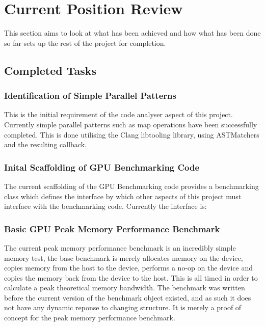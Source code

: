
\section{Current Position Review}

This section aims to look at what has been achieved and how what has been done so far sets up the rest of the project for completion.

\subsection{Completed Tasks}
\subsubsection{Identification of Simple Parallel Patterns}
This is the initial requirement of the code analyser aspect of this project. Currently simple parallel patterns such as map operations have been successfully completed. This is done utilising the Clang libtooling library, using ASTMatchers and the resulting callback.

\subsubsection{Inital Scaffolding of GPU Benchmarking Code}
The current scaffolding of the GPU Benchmarking code provides a benchmarking class which defines the interface by which other aspects of this project must interface with the benchmarking code. Currently the interface is:

\subsubsection{Basic GPU Peak Memory Performance Benchmark}
The current peak memory performance benchmark is an incredibly simple memory test, the base benchmark is merely allocates memory on the device, copies memory from the host to the device, performs a no-op on the device and copies the memory back from the device to the host. This is all timed in order to calculate a peak theoretical memory bandwidth. The benchmark was written before the current version of the benchmark object existed, and as such it does not have any dynamic reponse to changing structure. It is merely a proof of concept for the peak memory performance benchmark.


